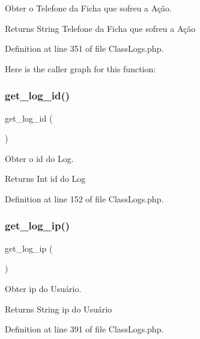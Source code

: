 Obter o Telefone da Ficha que sofreu a Ação. 

\begin{DoxyReturn}{Returns}
String Telefone da Ficha que sofreu a Ação 
\end{DoxyReturn}


Definition at line 351 of file Class\+Logs.\+php.

Here is the caller graph for this function\+:
\mbox{\label{class_class_logs_a46fd12a969be663423a41d6320ab1d4a}} 
\subsubsection{\texorpdfstring{get\+\_\+log\+\_\+id()}{get\_log\_id()}}
{\footnotesize\ttfamily get\+\_\+log\+\_\+id (\begin{DoxyParamCaption}{ }\end{DoxyParamCaption})}



Obter o id do Log. 

\begin{DoxyReturn}{Returns}
Int id do Log 
\end{DoxyReturn}


Definition at line 152 of file Class\+Logs.\+php.

\mbox{\label{class_class_logs_abedfbfb863da4fa609016ce17d504ab3}} 
\subsubsection{\texorpdfstring{get\+\_\+log\+\_\+ip()}{get\_log\_ip()}}
{\footnotesize\ttfamily get\+\_\+log\+\_\+ip (\begin{DoxyParamCaption}{ }\end{DoxyParamCaption})}



Obter ip do Usuário. 

\begin{DoxyReturn}{Returns}
String ip do Usuário 
\end{DoxyReturn}


Definition at line 391 of file Class\+Logs.\+php.


